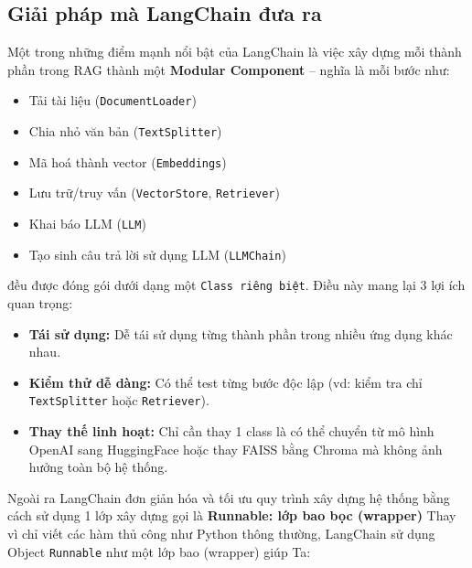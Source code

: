 \documentclass[11pt]{article}
\begin{document}
\vspace{1em}

\subsection{Giải pháp mà LangChain đưa ra}
Một trong những điểm mạnh nổi bật của LangChain là việc xây dựng mỗi thành phần trong RAG thành một \textbf{Modular Component} – nghĩa là mỗi bước như:
\begin{itemize}
    \item Tải tài liệu (\texttt{DocumentLoader})
    \item Chia nhỏ văn bản (\texttt{TextSplitter})
    \item Mã hoá thành vector (\texttt{Embeddings})
    \item Lưu trữ/truy vấn (\texttt{VectorStore}, \texttt{Retriever})
    \item Khai báo LLM (\texttt{LLM})
    \item Tạo sinh câu trả lời sử dụng LLM (\texttt{LLMChain})
\end{itemize}
đều được đóng gói dưới dạng một \texttt{Class riêng biệt}. Điều này mang lại 3 lợi ích quan trọng:
\begin{itemize}
    \item \textbf{Tái sử dụng:} Dễ tái sử dụng từng thành phần trong nhiều ứng dụng khác nhau.
    \item \textbf{Kiểm thử dễ dàng:} Có thể test từng bước độc lập (vd: kiểm tra chỉ \texttt{TextSplitter} hoặc \texttt{Retriever}).
    \item \textbf{Thay thế linh hoạt:} Chỉ cần thay 1 class là có thể chuyển từ mô hình OpenAI sang HuggingFace hoặc thay FAISS bằng Chroma mà không ảnh hưởng toàn bộ hệ thống.
\end{itemize}

\vspace{1em}

\noindent
Ngoài ra LangChain đơn giản hóa và tối ưu quy trình xây dựng hệ thống bằng cách sử dụng 1 lớp xây dựng gọi là \textbf{Runnable: lớp bao bọc (wrapper)}
Thay vì chỉ viết các hàm thủ công như Python thông thường, LangChain sử dụng Object \texttt{Runnable} như một lớp bao (wrapper) giúp Ta:
\end{document}
